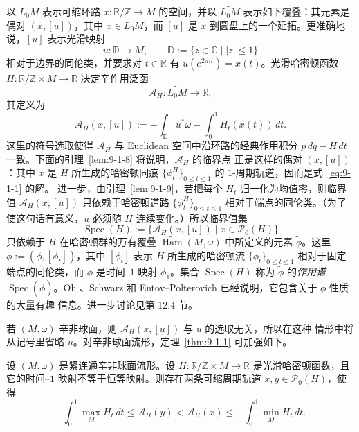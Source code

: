 以 $L_0M$ 表示可缩环路 $x:\mathbb R/\mathbb Z\to M$ 的空间，并以
$\widetilde{L_0M}$ 表示如下覆叠：其元素是偶对 $(x,[u])$，其中 $x\in L_0M$，而
$[u]$ 是 $x$ 到圆盘上的一个延拓。更准确地说，$[u]$ 表示光滑映射
\[
  u:\mathbb D\longrightarrow M,
  \qquad \mathbb D:=\{z\in\mathbb C\mid |z|\le1\}
\]
相对于边界的同伦类，并要求对 $t\in\mathbb R$ 有
$u(e^{2\pi it})=x(t)$。光滑哈密顿函数
$H:\mathbb R/\mathbb Z\times M\to\mathbb R$ 决定辛作用泛函
\[
  \mathcal A_H:\widetilde{L_0M}\longrightarrow\mathbb R,
\]
其定义为
\begin{equation}\label{eq:9-1-7}
  \mathcal A_H(x,[u])
  :=-\int_{\mathbb D}u^*\omega-\int_0^1H_t(x(t))\,dt.
\end{equation}
这里的符号选取使得 $\mathcal A_H$ 与 Euclidean 空间中沿环路的经典作用积分
$p\,dq-H\,dt$ 一致。下面的引理~\ref{lem:9-1-8} 将说明，$\mathcal A_H$ 的临界点
正是这样的偶对 $(x,[u])$：其中 $x$ 是 $H$ 所生成的哈密顿同痕
$\{\phi_t^H\}_{0\le t\le1}$ 的 $1$-周期轨道，因而是式~\eqref{eq:9-1-1} 的解。
进一步，由引理~\ref{lem:9-1-9}，若把每个 $H_t$ 归一化为均值零，则临界值
$\mathcal A_H(x,[u])$ 只依赖于哈密顿道路
$\{\phi_t^H\}_{0\le t\le1}$ 相对于端点的同伦类。（为了使这句话有意义，$u$ 必须随
$H$ 连续变化。）所以临界值集
\[
  \operatorname{Spec}(H)
  :=\{\mathcal A_H(x,[u])\mid x\in\mathcal P_0(H)\}
\]
只依赖于 $H$ 在哈密顿群的万有覆叠
$\widetilde{\operatorname{Ham}}(M,\omega)$ 中所定义的元素 $\widetilde\phi$。这里
$\widetilde\phi:=(\phi,[\phi_t])$，其中 $[\phi_t]$ 表示 $H$ 所生成的哈密顿流
$\{\phi_t\}_{0\le t\le1}$ 相对于固定端点的同伦类，而 $\phi$ 是时间--$1$ 映射
$\phi_1$。集合 $\operatorname{Spec}(H)$ 称为 $\widetilde\phi$ 的\emph{作用谱}
$\operatorname{Spec}(\widetilde\phi)$。Oh 、Schwarz  和
Entov--Polterovich  已经说明，它包含关于 $\widetilde\phi$ 性质的大量有趣
信息。进一步讨论见第 12.4 节。

若 $(M,\omega)$ 辛非球面，则 $\mathcal A_H(x,[u])$ 与 $u$ 的选取无关，所以在这种
情形中将从记号里省略 $u$。对辛非球面流形，定理~\ref{thm:9-1-1} 可加强如下。

\begin{theorem}\label{thm:9-1-6}
设 $(M,\omega)$ 是紧连通辛非球面流形。设
$H:\mathbb R/\mathbb Z\times M\to\mathbb R$ 是光滑哈密顿函数，且它的时间--$1$
映射不等于恒等映射。则存在两条可缩周期轨道 $x,y\in\mathcal P_0(H)$，使得
\[
  -\int_0^1\max_MH_t\,dt
  \le\mathcal A_H(y)<\mathcal A_H(x)
  \le-\int_0^1\min_MH_t\,dt.
\]
\end{theorem}

